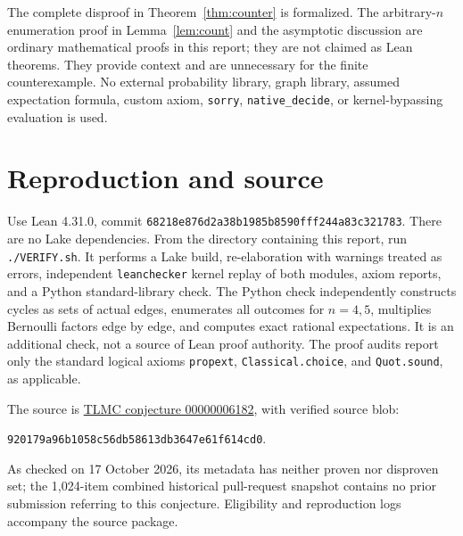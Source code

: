 \documentclass[11pt]{article}
\begin{document}
The complete disproof in Theorem~\ref{thm:counter} is formalized. The
arbitrary-$n$ enumeration proof in Lemma~\ref{lem:count} and the asymptotic
discussion are ordinary mathematical proofs in this report; they are not
claimed as Lean theorems. They provide context and are unnecessary for the
finite counterexample. No external probability library, graph library,
assumed expectation formula, custom axiom, \texttt{sorry},
\texttt{native\_decide}, or kernel-bypassing evaluation is used.

\section{Reproduction and source}
Use Lean 4.31.0, commit
\texttt{68218e876d2a38b1985b8590fff244a83c321783}.
There are no Lake dependencies. From the directory containing this report,
run \texttt{./VERIFY.sh}. It performs a Lake build, re-elaboration with
warnings treated as errors, independent \texttt{leanchecker} kernel replay
of both modules, axiom reports, and a Python standard-library check.
The Python check independently constructs cycles as sets of actual edges,
enumerates all outcomes for $n=4,5$, multiplies Bernoulli factors edge by
edge, and computes exact rational expectations. It is an additional check,
not a source of Lean proof authority. The proof audits report only the
standard logical axioms \texttt{propext}, \texttt{Classical.choice}, and
\texttt{Quot.sound}, as applicable.

The source is
\href{https://github.com/The-Last-Math-Competition/The-Last-Math-Competition/blob/cce2d90cb298de9595798eb674d2c80712100532/conjectures/00000006182.md}{TLMC conjecture 00000006182},
with verified source blob:
\begin{center}\small\texttt{920179a96b1058c56db58613db3647e61f614cd0}.\end{center}
As checked on 17 October 2026, its metadata has neither proven nor
disproven set; the 1,024-item combined historical pull-request snapshot
contains no prior submission referring to this conjecture. Eligibility
and reproduction logs accompany the source package.
\end{document}
